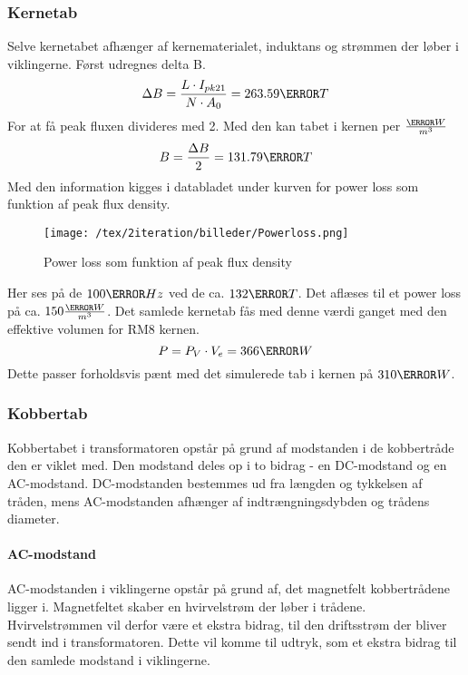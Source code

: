 \subsubsection{Kernetab}
Selve kernetabet afhænger af kernematerialet, induktans og strømmen der løber i viklingerne. Først udregnes delta B.
\begin{equation} \label{DeltaB}
\Delta B = \frac{L \cdot I_{pk21}}{N \cdot A_0} = 263.59\milli T
\end{equation}
For at få peak fluxen divideres med 2. Med den kan tabet i kernen per $\frac{\kilo W}{m^3}$
\begin{equation} \label{B}
B = \frac{\Delta B}{2} = 131.79\milli T
\end{equation}
Med den information kigges i databladet under kurven for power loss som funktion af peak flux density.
\begin{figure}[H]
	\center
	\texttt{[image: /tex/2iteration/billeder/Powerloss.png]}
	\caption{Power loss som funktion af peak flux density}
	\label{fig: Powerloss}
\end{figure}
Her ses på de $100\kilo Hz$ ved de ca. $132\milli T$. Det aflæses til et power loss på ca. $150\frac{\kilo W}{m^3}$.
Det samlede kernetab fås med denne værdi ganget med den effektive volumen for RM8 kernen.
\begin{equation} \label{DeltaB}
P = P_V \cdot V_e = 366\milli W
\end{equation}
Dette passer forholdsvis pænt med det simulerede tab i kernen på $310\milli W$.

\subsubsection{Kobbertab}
Kobbertabet i transformatoren opstår på grund af modstanden i de kobbertråde den er viklet med. Den modstand deles op i to bidrag - en DC-modstand og en AC-modstand. DC-modstanden bestemmes ud fra længden og tykkelsen af tråden, mens AC-modstanden afhænger af indtrængningsdybden og trådens diameter. 

\paragraph{AC-modstand}
AC-modstanden i viklingerne opstår på grund af, det magnetfelt kobbertrådene ligger i. Magnetfeltet skaber en hvirvelstrøm der løber i trådene. Hvirvelstrømmen vil derfor være et ekstra bidrag, til den driftsstrøm der bliver sendt ind i transformatoren. Dette vil komme til udtryk, som et ekstra bidrag til den samlede modstand i viklingerne. 

